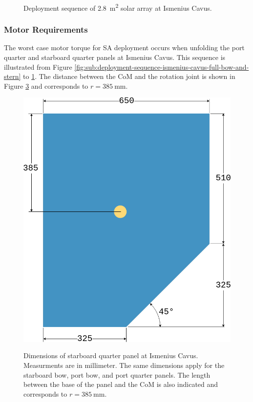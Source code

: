 \begin{figure}[h]
\begin{subfigure}[t]{\subfigureWidth}
		\label{fig:sub:deployment-sequence-ismenius-cavus-completed}
	\end{subfigure}
	\caption{Deployment sequence of \SI{2.8}{\meter\squared} solar array at Ismenius Cavus.}
	\label{fig:deployment-sequence-ismenius-cavus}
\vspace{-2ex}
\end{figure}

\clearpage
\subsubsection{Motor Requirements}
The worst case motor torque for \ac{SA} deployment occurs when unfolding the port quarter and starboard quarter panels at Ismenius Cavus. This sequence is illustrated from Figure \ref{fig:sub:deployment-sequence-ismenius-cavus-full-bow-and-stern} to \ref{fig:sub:deployment-sequence-ismenius-cavus-completed}. The distance between the \ac{CoM} and the rotation joint is shown in Figure \ref{fig:ismenius-cavus-solar-panel-starboard-quarter-dimensions} and corresponds to $r = \SI{385}{\milli\metre}$.

\vspace{0.25cm}

\begin{figure}[h]
  \captionsetup[subfigure]{justification=centering}
  \centering
  \hypersetup{linkcolor=captionTextColor}
  \includegraphics[width=0.45\linewidth]{sections/design/solar-array/images/ismenius-cavus-solar-panel-starboard-quarter.png}\\
  \caption[Dimensions of starboard quarter panel at Ismenius Cavus]
          {Dimensions of starboard quarter panel at Ismenius Cavus. Measurments are in millimeter. The same dimensions apply for the starboard bow, port bow, and port quarter panels. The length between the base of the panel and the \ac{CoM} is also indicated and corresponds to $r = \SI{385}{\milli\metre}$.}
  \label{fig:ismenius-cavus-solar-panel-starboard-quarter-dimensions}
\end{figure}

